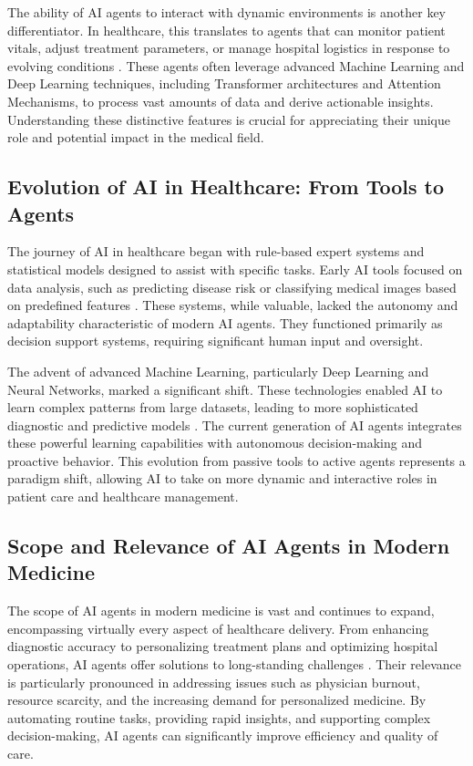 \documentclass[12pt,a4paper]{article}
\begin{document}
The ability of AI agents to interact with dynamic environments is another key differentiator. In healthcare, this translates to agents that can monitor patient vitals, adjust treatment parameters, or manage hospital logistics in response to evolving conditions \cite{shah2019artificial}. These agents often leverage advanced Machine Learning and Deep Learning techniques, including Transformer architectures and Attention Mechanisms, to process vast amounts of data and derive actionable insights. Understanding these distinctive features is crucial for appreciating their unique role and potential impact in the medical field.

\subsection{Evolution of AI in Healthcare: From Tools to Agents}
\label{subsec:evolution-ai}
The journey of AI in healthcare began with rule-based expert systems and statistical models designed to assist with specific tasks. Early AI tools focused on data analysis, such as predicting disease risk or classifying medical images based on predefined features \cite{lecun2015deep}. These systems, while valuable, lacked the autonomy and adaptability characteristic of modern AI agents. They functioned primarily as decision support systems, requiring significant human input and oversight.

The advent of advanced Machine Learning, particularly Deep Learning and Neural Networks, marked a significant shift. These technologies enabled AI to learn complex patterns from large datasets, leading to more sophisticated diagnostic and predictive models \cite{esteva2017dermatologist}. The current generation of AI agents integrates these powerful learning capabilities with autonomous decision-making and proactive behavior. This evolution from passive tools to active agents represents a paradigm shift, allowing AI to take on more dynamic and interactive roles in patient care and healthcare management.

\subsection{Scope and Relevance of AI Agents in Modern Medicine}
\label{subsec:scope-relevance}
The scope of AI agents in modern medicine is vast and continues to expand, encompassing virtually every aspect of healthcare delivery. From enhancing diagnostic accuracy to personalizing treatment plans and optimizing hospital operations, AI agents offer solutions to long-standing challenges \cite{davenport2019ai}. Their relevance is particularly pronounced in addressing issues such as physician burnout, resource scarcity, and the increasing demand for personalized medicine. By automating routine tasks, providing rapid insights, and supporting complex decision-making, AI agents can significantly improve efficiency and quality of care.
\end{document}
